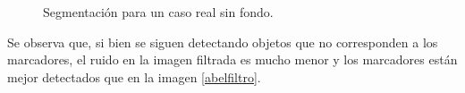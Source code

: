 \begin{figure}[ht!]
        \hspace{-1cm}
         \hspace{1 mm}
  \caption{Segmentación para un caso real sin fondo.}
      \label{ejemploabelsf}
\end{figure}

Se observa que, si bien se siguen detectando objetos que no corresponden a los marcadores, el ruido en la imagen filtrada es mucho menor y los marcadores están mejor detectados que en la imagen \ref{abelfiltro}.

